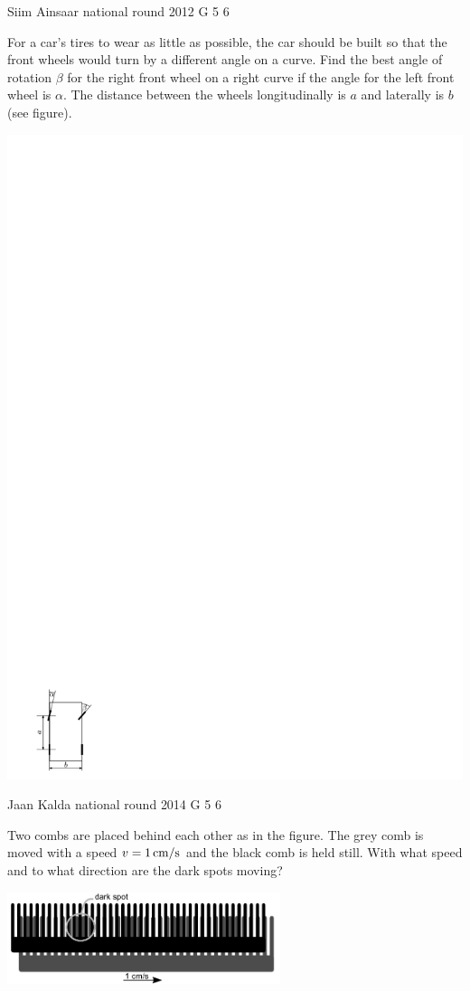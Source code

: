 \documentclass[11pt]{article}
\begin{document}
{Siim Ainsaar} %
{national round} %
{2012} %
{G 5} %
{6} %
{

\ifEngStatement
For a car’s tires to wear as little as possible, the car should be built so that the front wheels would turn by a different angle on a curve. Find the best angle of rotation $\beta$ for the right front wheel on a right curve if the angle for the left front wheel is $\alpha$. The distance between the wheels longitudinally is $a$ and laterally is $b$ (see figure).
\begin{center}
\includegraphics[width=0.3\linewidth]{2012-v3g-05-r_yl_joonis}%
\end{center}
\fi
}

{Jaan Kalda} %
{national round} %
{2014} %
{G 5} %
{6} %
{

\ifEngStatement
Two combs are placed behind each other as in the figure. The grey comb is moved with a speed $v=\SI 1{cm/s}$ and the black comb is held still.  With what speed and to what direction are the dark spots moving?
\begin{center}
\includegraphics[width=0.6\textwidth]{2014-v3g-05-kammid_ing}
\end{center}
\fi
}
\end{document}

